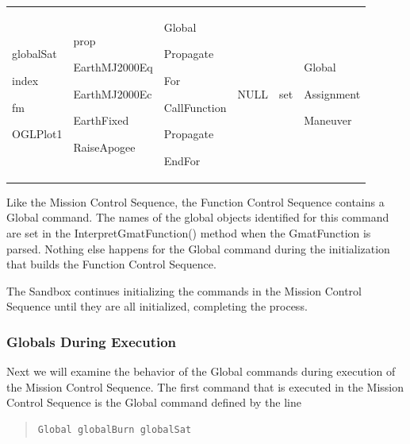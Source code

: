 \begin{center}
\begin{supertabular}{|p{0.95in}|p{0.95in}|p{0.95in}|p{0.95in}|p{0.95in}|p{0.95in}|}
\begin{small}
globalSat

index

fm

OGLPlot1
\end{small} &
\begin{small}
prop

EarthMJ2000Eq

EarthMJ2000Ec

EarthFixed

RaiseApogee
\end{small} &
\begin{small}
Global

Propagate

For

CallFunction

Propagate

EndFor
\end{small} &
\begin{small}
NULL
\end{small} &
\begin{small}
set
\end{small} &
\begin{small}
Global

Assignment

Maneuver
\end{small} \\
\end{supertabular}
\end{center}

Like the Mission Control Sequence, the Function Control Sequence contains a Global command.  The
names of the global objects identified for this command are set in the InterpretGmatFunction()
method when the GmatFunction is parsed.  Nothing else happens for the Global command during the
initialization that builds the Function Control Sequence.

The Sandbox continues initializing the commands in the Mission Control Sequence until they are all
initialized, completing the process.

\subsubsection{Globals During Execution}
Next we will examine the behavior of the Global commands during execution of the Mission Control
Sequence.  The first command that is executed in the Mission Control Sequence is the Global command
defined by the line

\begin{quote}
\begin{verbatim}
Global globalBurn globalSat
\end{verbatim}
\end{quote}

